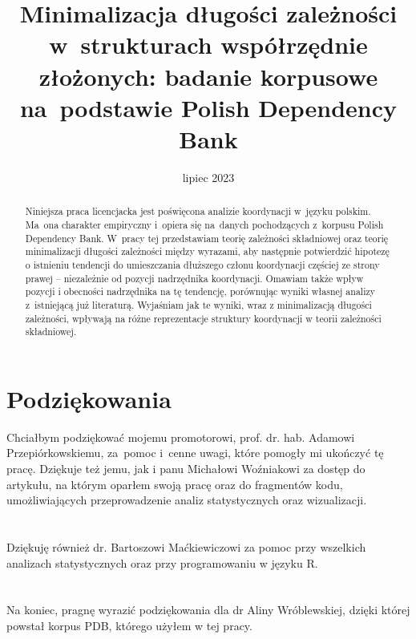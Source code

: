 \documentclass[licencjacka]{pracamgr_Kogni}
\title{Minimalizacja długości zależności w~strukturach współrzędnie złożonych: badanie korpusowe na~podstawie Polish Dependency Bank}
\date{lipiec 2023}
\begin{document}
    \maketitle


    \begin{abstract}
        {Niniejsza praca licencjacka jest poświęcona analizie koordynacji w~języku polskim. Ma~ona charakter empiryczny i~opiera się na~danych pochodzących z~korpusu Polish Dependency Bank. W~pracy tej przedstawiam teorię zależności składniowej oraz teorię minimalizacji długości zależności między wyrazami, aby następnie potwierdzić hipotezę o istnieniu tendencji do umieszczania dłuższego członu koordynacji częściej ze strony prawej -- niezależnie od pozycji nadrzędnika koordynacji. Omawiam także wpływ pozycji i obecności nadrzędnika na tę tendencję, porównując wyniki własnej analizy z~istniejącą już literaturą. Wyjaśniam jak te wyniki, wraz z minimalizacją długości zależności, wpływają na różne reprezentacje struktury koordynacji w teorii zależności składniowej.}
    \end{abstract}


    \thispagestyle{empty}
    \setcounter{page}{3}
    \tableofcontents

    \chapter*{Podziękowania}
    \phantom{a}

    Chciałbym podziękować mojemu promotorowi, prof. dr. hab. Adamowi Przepiórkowskiemu, za~pomoc i~cenne uwagi, które pomogły mi ukończyć tę pracę. Dziękuje też jemu, jak i panu Michałowi Woźniakowi za dostęp do artykułu, na którym oparłem swoją pracę oraz do fragmentów kodu, umożliwiających przeprowadzenie analiz statystycznych oraz wizualizacji.
    \\
    \\
    \\

    Dziękuję również dr. Bartoszowi Maćkiewiczowi za pomoc przy wszelkich analizach statystycznych oraz przy programowaniu w języku R.
    \\
    \\
    \\

    Na koniec, pragnę wyrazić podziękowania dla dr Aliny Wróblewskiej, dzięki której powstał korpus PDB, którego użyłem w tej pracy.
\end{document}
